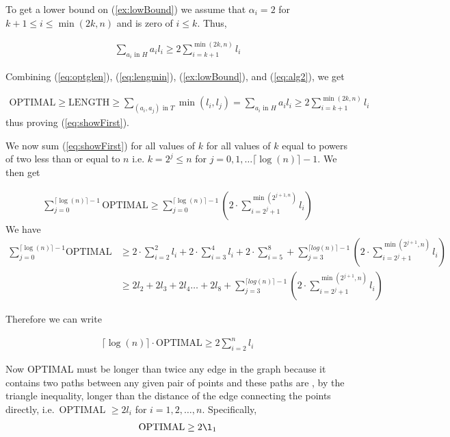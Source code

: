 To get a lower bound on (\ref{ex:lowBound}) we assume that $\alpha_i = 2 $ for $k+1 \leq i \leq \min(2k,n)$ and is zero of $i \leq k$. Thus,

\begin{align}
\sum_{a_i \text{ in } H} a_i l_i \geq 2 \sum_{i=k+1}^{\min(2k,n)} l_i \label{eq:alg2}
\end{align}

Combining (\ref{eq:optglen}), (\ref{eq:lengmin}), (\ref{ex:lowBound}), and (\ref{eq:alg2}), we get

\begin{align*}
\text{OPTIMAL} \geq \text{LENGTH} \geq \sum_{(a_i,a_j) \text{ in } T} \min(l_i,l_j) = \sum_{a_i \text{ in } H} a_i l_i \geq 2 \sum_{i=k+1}^{\min(2k,n)} l_i
\end{align*}
thus proving (\ref{eq:showFirst}). 

We now sum (\ref{eq:showFirst}) for all values of $k$ for all values of $k$ equal to powers of two less than or equal to $n$ i.e. $k = 2^{j} \leq n$ for $j = 0, 1, \dots \lceil \log(n) \rceil - 1$. We then get

\begin{align*}
\sum_{j=0}^{\lceil \log(n) \rceil -1} \text{OPTIMAL} \geq \sum_{j=0}^{\lceil \log(n) \rceil - 1} ( 2 \cdot \sum_{i=2^j + 1}^{\min(2^{j+1,n})} l_i )
\end{align*}
We have
\begin{align*}
\sum_{j=0}^{\lceil \log(n) \rceil -1} \text{OPTIMAL} &\geq 2 \cdot \sum_{i=2}^2 l_i + 2 \cdot \sum_{i=3}^4 l_i + 2 \cdot \sum_{i=5}^8 + \sum_{j=3}^{\lceil log(n) \rceil - 1} (2 \cdot \sum_{i = 2^j+1}^{\min(2^{j+1},n)} l_i )\\
& \geq 2 l_2 + 2 l_3 + 2 l_4 \dots +2l_8 + \sum_{j=3}^{\lceil log(n) \rceil - 1} (2 \cdot \sum_{i = 2^j+1}^{\min(2^{j+1},n)} l_i)
\end{align*}

Therefore we can write

\begin{align}
\lceil \log(n) \rceil \cdot \text{OPTIMAL} \geq 2 \sum_{i = 2}^n l_i \label{eq:lognoptt}
\end{align}

Now OPTIMAL must be longer than twice any edge in the graph because it contains two paths between any given pair of points and these paths are , by the triangle  inequality, longer than the distance of the edge connecting the points directly, i.e.\ OPTIMAL $\geq 2 l_i$ for $i = 1,2,\dots, n$. Specifically,
\begin{align}
\text{OPTIMAL} \geq 2 \l_1 \label{eq:optgl1}
\end{align}

